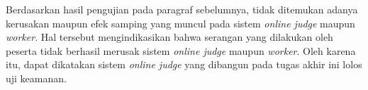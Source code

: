 \par Berdasarkan hasil pengujian pada paragraf sebelumnya, tidak ditemukan adanya kerusakan maupun efek samping yang muncul pada sistem \textit{online judge} maupun \textit{worker}. Hal tersebut mengindikasikan bahwa serangan yang dilakukan oleh peserta tidak berhasil merusak sistem \textit{online judge} maupun \textit{worker}. Oleh karena itu, dapat dikatakan sistem \textit{online judge} yang dibangun pada tugas akhir ini lolos uji keamanan.


